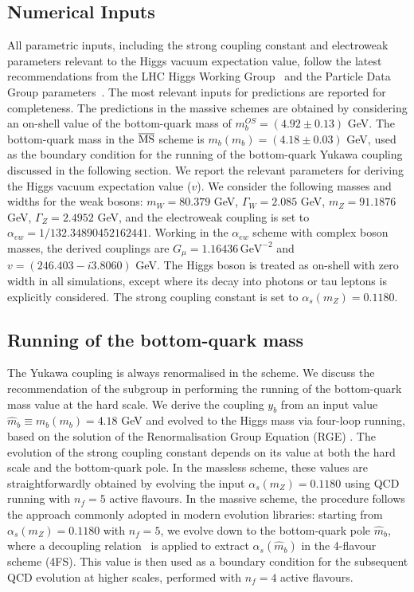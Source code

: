\documentclass[11pt,a4paper]{article}
\begin{document}
\subsection{Numerical Inputs}
All parametric inputs, including the strong coupling constant and electroweak parameters relevant to the Higgs vacuum expectation value, follow the latest recommendations from the LHC Higgs Working Group~\cite{Karlberg:2024zxx} and the Particle Data Group parameters~\cite{ParticleDataGroup:2024cfk}. The most relevant inputs for \bbH{} predictions are reported for completeness. The predictions in the massive schemes are obtained by considering an on-shell value of the bottom-quark mass of $m_b^{OS}=(4.92\pm0.13)$ GeV. The bottom-quark mass in the $\overline{\text{MS}}{}$ scheme is $m_b(m_b)=(4.18\pm0.03)$ GeV, used as the boundary condition for the running of the bottom-quark Yukawa coupling discussed in the following section. We report the relevant parameters for deriving the Higgs vacuum expectation value ($v$). We consider the following masses and widths for the weak bosons: $m_W = 80.379$ GeV, $\Gamma_W=2.085$ GeV, $m_Z = 91.1876$ GeV, $\Gamma_Z=2.4952$ GeV, and the electroweak coupling is set to $\alpha_{ew}=1/132.34890452162441$. Working in the $\alpha_{ew}$ scheme with complex boson masses, the derived couplings are $G_\mu=1.16436\,\text{GeV}^{-2}$ and $v=(246.403-i3.8060)$ GeV. The Higgs boson is treated as on-shell with zero width in all simulations, except where its decay into photons or tau leptons is explicitly considered. The strong coupling constant is set to $\alpha_s(m_Z)=0.1180$.

\subsection{Running of the bottom-quark mass}
The Yukawa coupling is always renormalised in the \MSbar{} scheme. We discuss the recommendation of the \bbH{} subgroup in performing the running of the bottom-quark mass value at the hard scale. We derive the coupling $y_b$ from an input value $\hat m_b\equiv m_b(m_b)=4.18$ GeV and evolved to the Higgs mass via four-loop running, based on the solution of the Renormalisation Group Equation (RGE) \cite{harlander:2002wh,baikov_2014}. The evolution of the strong coupling constant depends on its value at both the hard scale and the bottom-quark pole. In the massless scheme, these values are straightforwardly obtained by evolving the input $\alpha_s(m_Z) = 0.1180$ using QCD running with $n_f = 5$ active flavours. In the massive scheme, the procedure follows the approach commonly adopted in modern evolution libraries: starting from $\alpha_s(m_Z) = 0.1180$ with $n_f = 5$, we evolve down to the bottom-quark pole $\hat{m}_b$, where a decoupling relation~\cite{vogt:2004ns} is applied to extract $\alpha_s(\hat{m}_b)$ in the 4-flavour scheme (4FS). This value is then used as a boundary condition for the subsequent QCD evolution at higher scales, performed with $n_f = 4$ active flavours.
\end{document}

